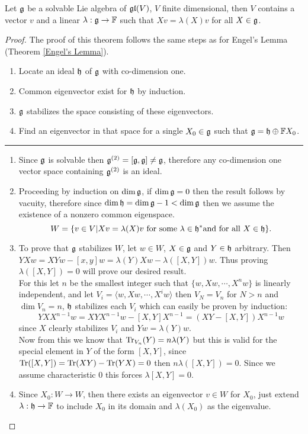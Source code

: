 \begin{teo}
	Let $\mathfrak{g}$ be a solvable Lie algebra of $\mathfrak{gl}(V)$, $V$ finite dimensional, then $V$ contains a vector $v$ and a linear $\lambda:\mathfrak{g} \rightarrow \mathbb{F}$ such that $Xv = \lambda(X)v$ for all $X \in \mathfrak{g}$.
	\label{Lie's Theorem}
\end{teo}
\begin{proof}
	The proof of this theorem follows the same steps as for Engel's Lemma (Theorem \ref{Engel's Lemma}).
	\begin{enumerate}
		\item Locate an ideal $\mathfrak{h}$ of $\mathfrak{g}$ with co-dimension one.
		\item Common eigenvector exist for $\mathfrak{h}$ by induction.
		\item $\mathfrak{g}$ stabilizes the space consisting of these eigenvectors.
		\item Find an eigenvector in that space for a single $X_0 \in \mathfrak{g}$ such that $\mathfrak{g} = \mathfrak{h} \oplus \mathbb{F} X_0$.
	\end{enumerate}
	\noindent\rule{16cm}{0.4pt}
	\begin{enumerate}
		\item Since $\mathfrak{g}$ is solvable then $\mathfrak{g}^{(2)}=[\mathfrak{g},\mathfrak{g}]\not=\mathfrak{g}$, therefore any co-dimension one vector space  containing $\mathfrak{g}^{(2)}$ is an ideal.\\
		\item Proceeding by induction on $\dim \mathfrak{g}$, if $\dim \mathfrak{g}=0$ then the result follows by vacuity, therefore since $\dim \mathfrak{h} = \dim \mathfrak{g} - 1 < \dim \mathfrak{g}$ then we assume the existence of a nonzero common eigenspace. $$W = \{v \in V | Xv = \lambda(X)v \text{ for some } \lambda \in \mathfrak{h}^* \text{and for all }X \in \mathfrak{h}\}.$$
		\item To prove that $\mathfrak{g}$ stabilizes $W$, let $w \in W$, $X \in \mathfrak{g}$ and $Y \in \mathfrak{h}$ arbitrary. Then $YXw = XYw - [x,y]w = \lambda(Y)Xw - \lambda([X,Y])w$. Thus proving $\lambda([X,Y])=0$ will prove our desired result.\\
		For this let $n$ be the smallest integer such that $\{w,Xw,\cdots,X^nw\}$ is linearly independent, and let $V_i = \langle w, Xw , \cdots, X^i w\rangle$ then $V_{N} = V_n$ for $N>n$ and $\dim V_n = n$, $\mathfrak{h}$ stabilizes each $V_i$ which can easily be proven by induction:
		$$YXX^{n-1}w = XYX^{n-1}w - [X,Y]X^{n-1} = (XY - [X,Y])X^{n-1}w$$ since $X$ clearly stabilizes $V_i$ and $Yw = \lambda(Y)w$.\\
		Now from this we know that $\text{Tr}_{V_n}(Y)=n\lambda(Y)$ but this is valid for the special element in $Y$ of the form $[X,Y]$, since $\text{Tr}([X,Y])= \text{Tr}(XY)-\text{Tr}(YX)=0$ then $n\lambda([X,Y])=0$. Since we assume characteristic $0$ this forces $\lambda[X,Y]=0$.
		\item Since $X_0: W \rightarrow W$, then there exists an eigenvector $v \in W$ for $X_0$, just extend $\lambda: \mathfrak{h} \rightarrow \mathbb{F}$ to include $X_0$ in its domain and $\lambda(X_0)$ as the eigenvalue.
		\end{enumerate}
\end{proof}